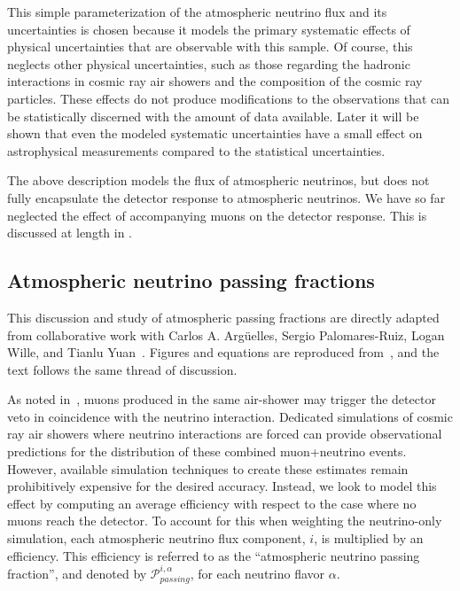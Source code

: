 This simple parameterization of the atmospheric neutrino flux and its uncertainties is chosen because it models the primary systematic effects of physical uncertainties that are observable with this sample.
Of course, this neglects other physical uncertainties, such as those regarding the hadronic interactions in cosmic ray air showers and the composition of the cosmic ray particles.
These effects do not produce modifications to the observations that can be statistically discerned with the amount of data available.
Later it will be shown that even the modeled systematic uncertainties have a small effect on astrophysical measurements compared to the statistical uncertainties.

The above description models the flux of atmospheric neutrinos, but does not fully encapsulate the detector response to atmospheric neutrinos.
We have so far neglected the effect of accompanying muons on the detector response.
This is discussed at length in .

\subsection{Atmospheric neutrino passing fractions}
\label{sec:passingfractions}
This discussion and study of atmospheric passing fractions are directly adapted from collaborative work with Carlos A. Argüelles, Sergio Palomares-Ruiz, Logan Wille, and Tianlu Yuan~\cite{Arguelles:2018awr}.
Figures and equations are reproduced from~\cite{Arguelles:2018awr}, and the text follows the same thread of discussion.

As noted in~\cite{Schonert:2008is}, muons produced in the same air-shower may trigger the detector veto in coincidence with the neutrino interaction.
Dedicated simulations of cosmic ray air showers where neutrino interactions are forced can provide observational predictions for the distribution of these combined muon+neutrino events.
However, available simulation techniques to create these estimates remain prohibitively expensive for the desired accuracy.
Instead, we look to model this effect by computing an average efficiency with respect to the case where no muons reach the detector.
To account for this when weighting the neutrino-only simulation, each atmospheric neutrino flux component, $i$, is multiplied by an efficiency.
This efficiency is referred to as the ``atmospheric neutrino passing fraction'', and denoted by $\mathcal{P}^{i,\alpha}_{passing}$, for each neutrino flavor $\alpha$.

